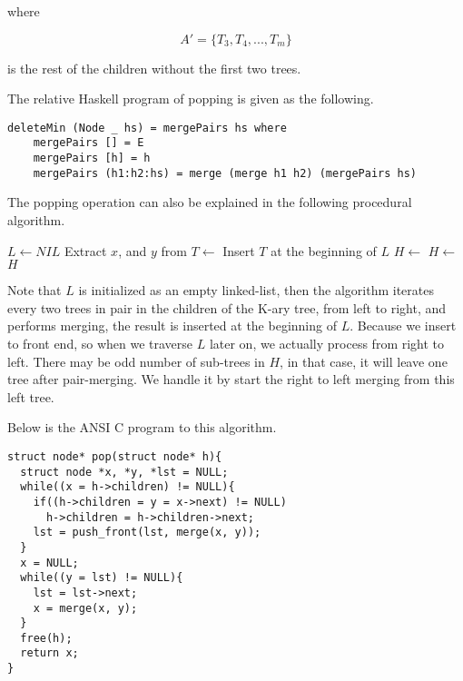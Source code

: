 \documentclass{article}
\begin{document}
where

\[
A' = \{ T_3, T_4, ..., T_m\}
\]

is the rest of the children without the first two trees.

The relative Haskell program of popping is given as the following.

\lstset{language=Haskell}
\begin{lstlisting}
deleteMin (Node _ hs) = mergePairs hs where
    mergePairs [] = E
    mergePairs [h] = h
    mergePairs (h1:h2:hs) = merge (merge h1 h2) (mergePairs hs)
\end{lstlisting}

The popping operation can also be explained in the following
procedural algorithm.

\begin{algorithmic}[1]
  \State $L \gets NIL$
    \State Extract $x$, and $y$ from 
    \State $T \gets $ 
    \State Insert $T$ at the beginning of $L$
  \EndFor
  \State $H \gets $  
    \State $H \gets $ 
  \EndFor
  \State \Return $H$
\EndFunction
\end{algorithmic}

Note that $L$ is initialized as an empty linked-list, then the algorithm
iterates every two trees in pair in the children of the K-ary tree, from
left to right, and performs merging, the result is inserted at the beginning
of $L$. Because we insert to front end, so when we traverse $L$ later on,
we actually process from right to left. There may be odd number of sub-trees
in $H$, in that case, it will leave one tree after pair-merging. We
handle it by start the right to left merging from this left tree.

Below is the ANSI C program to this algorithm.

\lstset{language=C}
\begin{lstlisting}
struct node* pop(struct node* h){
  struct node *x, *y, *lst = NULL;
  while((x = h->children) != NULL){
    if((h->children = y = x->next) != NULL)
      h->children = h->children->next;
    lst = push_front(lst, merge(x, y));
  }
  x = NULL;
  while((y = lst) != NULL){
    lst = lst->next;
    x = merge(x, y);
  }
  free(h);
  return x;
}
\end{lstlisting}
\end{document}
